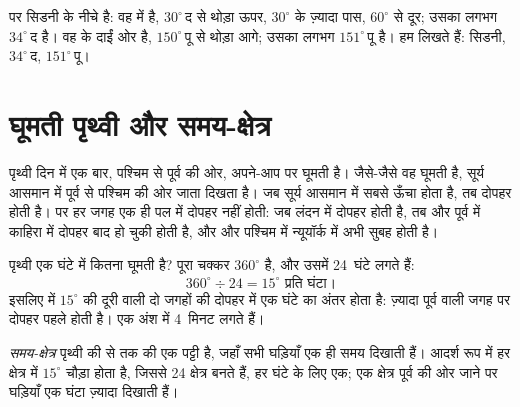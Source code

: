\begin{example}[सिडनी के निर्देशांक पढ़ना]\label{ex:g6:latitude-longitude:sydney}
 पर सिडनी  के नीचे है: वह  में है,  $30^\circ$\,द से थोड़ा ऊपर, $30^\circ$ के ज़्यादा पास,
$60^\circ$ से दूर; उसका  लगभग $34^\circ$\,द है। वह  के दाईं ओर है,  $150^\circ$\,पू से थोड़ा आगे; उसका
 लगभग $151^\circ$\,पू है। हम लिखते हैं: सिडनी, $34^\circ$\,द,
$151^\circ$\,पू।
\end{example}

\section{घूमती पृथ्वी और समय-क्षेत्र}

पृथ्वी दिन में एक बार, पश्चिम से पूर्व की ओर, अपने-आप पर घूमती है। जैसे-जैसे वह
घूमती है, सूर्य आसमान में पूर्व से पश्चिम की ओर जाता दिखता है। जब सूर्य आसमान में
सबसे ऊँचा होता है, तब दोपहर होती है। पर हर जगह एक ही पल में दोपहर नहीं होती:
जब लंदन में दोपहर होती है, तब और पूर्व में काहिरा में दोपहर बाद हो चुकी होती है,
और और पश्चिम में न्यूयॉर्क में अभी सुबह होती है।

पृथ्वी एक घंटे में कितना घूमती है? पूरा चक्कर $360^\circ$ है, और उसमें
24~घंटे लगते हैं:
\[
360^\circ \div 24 = 15^\circ \text{ प्रति घंटा।}
\]
इसलिए  में $15^\circ$ की दूरी वाली दो जगहों की दोपहर में एक घंटे का अंतर होता
है: ज़्यादा पूर्व वाली जगह पर दोपहर पहले होती है। एक अंश में 4~मिनट लगते हैं।

\begin{definition}[समय-क्षेत्र]\label{def:g6:latitude-longitude:time-zone}
\emph{समय-क्षेत्र} पृथ्वी की  से  तक की एक पट्टी है, जहाँ
सभी घड़ियाँ एक ही समय दिखाती हैं। आदर्श रूप में हर क्षेत्र  में
$15^\circ$ चौड़ा होता है, जिससे 24 क्षेत्र बनते हैं, हर घंटे के लिए एक;
एक क्षेत्र पूर्व की ओर जाने पर घड़ियाँ एक घंटा ज़्यादा दिखाती हैं।
\end{definition}

